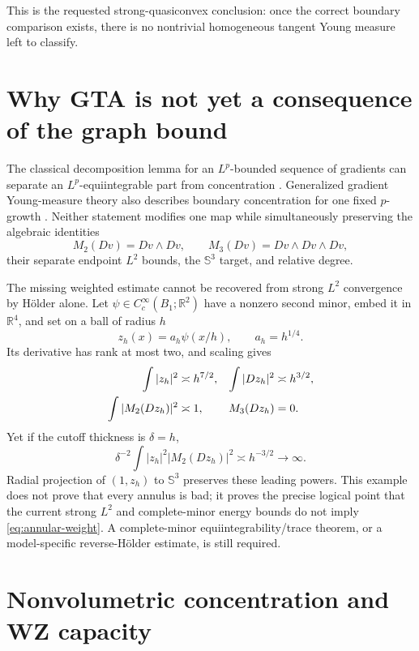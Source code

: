 \documentclass[10pt]{article}
\newcommand{\RR}{\mathbb R}
\newcommand{\SSS}{\mathbb S}
\begin{document}
This is the requested strong-quasiconvex conclusion: once the correct
boundary comparison exists, there is no nontrivial homogeneous tangent
Young measure left to classify.

\section{Why GTA is not yet a consequence of the graph bound}

The classical decomposition lemma for an $L^p$-bounded sequence of gradients
can separate an $L^p$-equiintegrable part from concentration
\cite{FonsecaMullerPedregal1998}.  Generalized gradient Young-measure theory
also describes boundary concentration for one fixed $p$-growth
\cite{Kruzik2012}.  Neither statement modifies one map while simultaneously
preserving the algebraic identities
\[
 M_2(Dv)=Dv\wedge Dv,\qquad M_3(Dv)=Dv\wedge Dv\wedge Dv,
\]
their separate endpoint $L^2$ bounds, the $\SSS^3$ target, and relative
degree.

The missing weighted estimate cannot be recovered from strong $L^2$
convergence by H\"older alone.  Let $\psi\in C_c^\infty(B_1;\RR^2)$ have a
nonzero second minor, embed it in $\RR^4$, and set on a ball of radius $h$
\begin{equation}
 z_h(x)=a_h\psi(x/h),\qquad a_h=h^{1/4}.                 \label{eq:microball}
\end{equation}
Its derivative has rank at most two, and scaling gives
\begin{align}
 \int|z_h|^2&\asymp h^{7/2},&
 \int|Dz_h|^2&\asymp h^{3/2},\notag\\
 \int|M_2(Dz_h)|^2&\asymp1,&
 M_3(Dz_h)&=0.                                         \label{eq:micro-scales}
\end{align}
Yet if the cutoff thickness is $\delta=h$,
\begin{equation}
 \delta^{-2}\int|z_h|^2|M_2(Dz_h)|^2
 \asymp h^{-3/2}\longrightarrow\infty.                  \label{eq:micro-weight}
\end{equation}
Radial projection of $(1,z_h)$ to $\SSS^3$ preserves these leading powers.
This example does not prove that every annulus is bad; it proves the precise
logical point that the current strong $L^2$ and complete-minor energy bounds
do not imply \eqref{eq:annular-weight}.  A complete-minor
equiintegrability/trace theorem, or a model-specific reverse-H\"older
estimate, is still required.

\section{Nonvolumetric concentration and WZ capacity}
\end{document}
